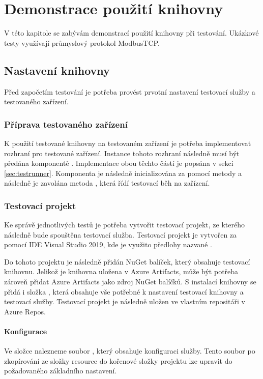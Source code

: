 \chapter{Demonstrace použití knihovny}\label{chap:demonstration}

V této kapitole se zabývám demonstrací použití knihovny při testování. Ukázkové testy využívají průmyslový protokol ModbusTCP. 

\section{Nastavení knihovny}
Před započetím testování je potřeba provést prvotní nastavení testovací služby a testovaného zařízení.

\subsection{Příprava testovaného zařízení}
K použití testované knihovny na testovaném zařízení je potřeba implementovat rozhraní pro testované zařízení. Instance tohoto rozhraní následně musí být předána komponentě . Implementace obou těchto částí je popsána v sekci \ref{sec:testrunner}. Komponenta  je následně inicializována za pomocí metody  a následně je zavolána metoda , která řídí testovací běh na zařízení.
 
\subsection{Testovací projekt}
Ke správě jednotlivých testů je potřeba vytvořit testovací projekt, ze kterého následně bude spouštěna testovací služba. Testovací projekt je vytvořen za pomocí IDE Visual Studio 2019, kde je využito předlohy nazvané .

Do tohoto projektu je následně přidán NuGet balíček, který obsahuje testovací knihovnu. Jelikož je knihovna uložena v Azure Artifacts, může být potřeba zároveň přidat Azure Artifacts jako zdroj NuGet balíčků. S instalací knihovny se přidá i složka , která obsahuje vše potřebné k nastavení testovací knihovny a testovací služby. Testovací projekt je následně uložen ve vlastním repositáři v Azure Repos.  

\subsubsection{Konfigurace}
Ve složce  nalezneme soubor , který obsahuje konfiguraci služby. Tento soubor po zkopírování ze složky resource do kořenové složky projektu lze upravit do požadovaného základního nastavení. 

